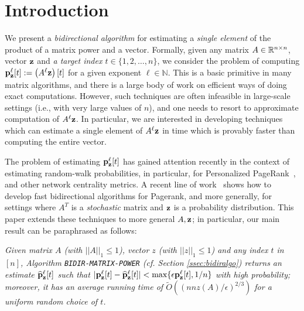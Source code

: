 \section{Introduction}
\label{sec:intro}

We present a \emph{bidirectional algorithm} for estimating a \emph{single element} of the product of a matrix power and a vector.
Formally, given any matrix $A\in\mathbb{R}^{n\times n}$, vector $\mathbf{z}$ and \emph{a target index $t\in\{1,2,\ldots,n\}$}, we consider the problem of computing ${\mathbf{p}}_\mathbf{z}^{\ell}[t] := \left(A^{\ell}\mathbf{z}\right)[t]$ for a given exponent $\ell\in\mathbb{N}$.
This is a basic primitive in many matrix algorithms, and there is a large body of work on efficient ways of doing exact computations. 
However, such techniques are often infeasible in large-scale settings (i.e., with very large values of $n$), and one needs to resort to approximate computation of $A^{\ell}\mathbf{z}$.
In particular, we are interested in developing techniques which can estimate a single element of $A^{\ell}\mathbf{z}$ in time which is provably faster than computing the entire vector. 

The problem of estimating ${\mathbf{p}}_\mathbf{z}^{\ell}[t]$ has gained attention recently in the context of estimating random-walk probabilities, in particular, for Personalized PageRank~\cite{Page1999}, and other network centrality metrics. 
A recent line of work~\cite{Lofgren2014,lofgren2016personalized,banerjee2015fast} shows how to develop fast bidirectional algorithms for Pagerank, and more generally, for settings where $A^T$ is a \emph{stochastic} matrix and $\mathbf{z}$ is a probability distribution.
This paper extends these techniques to more general $A,\mathbf{z}$; in particular, our main result can be paraphrased as follows:
\begin{proposition}
\emph{Given matrix $A$ (with $||A||_1\leq 1$), vector $z$ (with $||z||_1\leq 1$) and any index $t$ in $[n]$, Algorithm \texttt{BIDIR-MATRIX-POWER} (cf. Section \ref{ssec:bidiralgo}) returns an estimate $\widehat{\mathbf{p}}_\mathbf{z}^{\ell}[t]$ such that $|{\mathbf{p}}_\mathbf{z}^{\ell}[t]-\widehat{\mathbf{p}}_\mathbf{z}^{\ell}[t]|<\max\{\epsilon{\mathbf{p}}_\mathbf{z}^{\ell}[t],1/n\}$ with high probability; moreover, it has an average running time of $\widetilde{O}\left(\left(nnz(A)/\epsilon\right)^{2/3}\right)$ for a uniform random choice of $t$.}
\end{proposition}	

